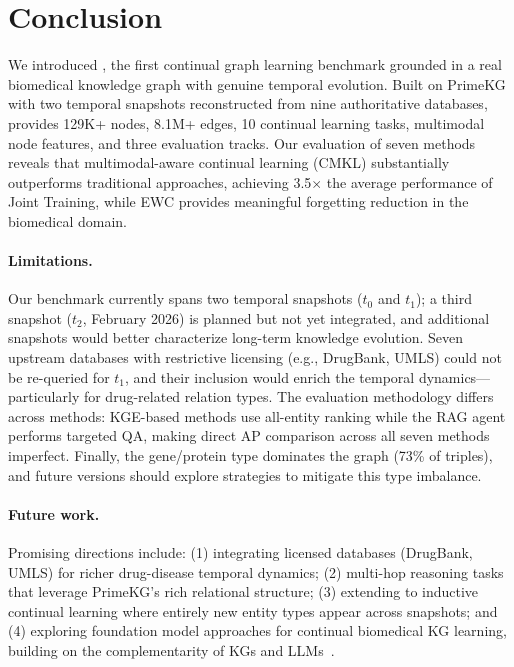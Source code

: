 \section{Conclusion}
\label{sec:conclusion}

We introduced \ours, the first continual graph learning benchmark grounded in a real biomedical knowledge graph with genuine temporal evolution.
Built on PrimeKG with two temporal snapshots reconstructed from nine authoritative databases, \ours provides 129K+ nodes, 8.1M+ edges, 10 continual learning tasks, multimodal node features, and three evaluation tracks.
Our evaluation of seven methods reveals that multimodal-aware continual learning (CMKL) substantially outperforms traditional approaches, achieving 3.5$\times$ the average performance of Joint Training, while EWC provides meaningful forgetting reduction in the biomedical domain.

\paragraph{Limitations.}
Our benchmark currently spans two temporal snapshots ($t_0$ and $t_1$); a third snapshot ($t_2$, February 2026) is planned but not yet integrated, and additional snapshots would better characterize long-term knowledge evolution.
Seven upstream databases with restrictive licensing (e.g., DrugBank, UMLS) could not be re-queried for $t_1$, and their inclusion would enrich the temporal dynamics---particularly for drug-related relation types.
The evaluation methodology differs across methods: KGE-based methods use all-entity ranking while the RAG agent performs targeted QA, making direct AP comparison across all seven methods imperfect.
Finally, the gene/protein type dominates the graph (73\% of triples), and future versions should explore strategies to mitigate this type imbalance.

\paragraph{Future work.}
Promising directions include: (1) integrating licensed databases (DrugBank, UMLS) for richer drug-disease temporal dynamics; (2) multi-hop reasoning tasks that leverage PrimeKG's rich relational structure; (3) extending to inductive continual learning where entirely new entity types appear across snapshots; and (4) exploring foundation model approaches for continual biomedical KG learning, building on the complementarity of KGs and LLMs~\citep{Pan2024}.
